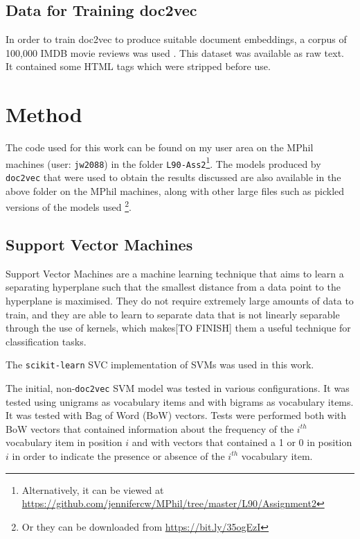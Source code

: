 \documentclass[twocolumn]{article}
\begin{document}
\subsection{Data for Training doc2vec}

In order to train doc2vec to produce suitable document embeddings, a corpus of 100,000 IMDB movie reviews was used \cite{bigimdb}. This dataset was available as raw text. It contained some HTML tags which were stripped before use.

\section{Method}

The code used for this work can be found on my user area on the MPhil machines (user: \texttt{jw2088}) in the folder \texttt{L90-Ass2}\footnote{Alternatively, it can be viewed at \url{https://github.com/jennifercw/MPhil/tree/master/L90/Assignment2}}. The models produced by \texttt{doc2vec} that were used to obtain the results discussed are also available in the above folder on the MPhil machines, along with other large files such as pickled versions of the models used \footnote{Or they can be downloaded from \url{https://bit.ly/35ogEzI}}. 

\subsection{Support Vector Machines}

Support Vector Machines are a machine learning technique that aims to learn a separating hyperplane such that the smallest distance from a data point to the hyperplane is maximised. They do not require extremely large amounts of data to train, and they are able to learn to separate data that is not linearly separable through the use of kernels, which makes[TO FINISH]
 them a useful technique for classification tasks.

The \texttt{scikit-learn}\cite{scikit-learn} SVC implementation of SVMs was used in this work.

The initial, non-\texttt{doc2vec} SVM model was tested in various configurations. It was tested using unigrams as vocabulary items and with bigrams as vocabulary items. It was tested with Bag of Word (BoW) vectors. Tests were performed both with BoW vectors that contained information about the frequency of the $i^{th}$ vocabulary item in position $i$ and with vectors that contained a 1 or 0 in position $i$ in order to indicate the presence or absence of the $i^{th}$ vocabulary item. 
\end{document}
